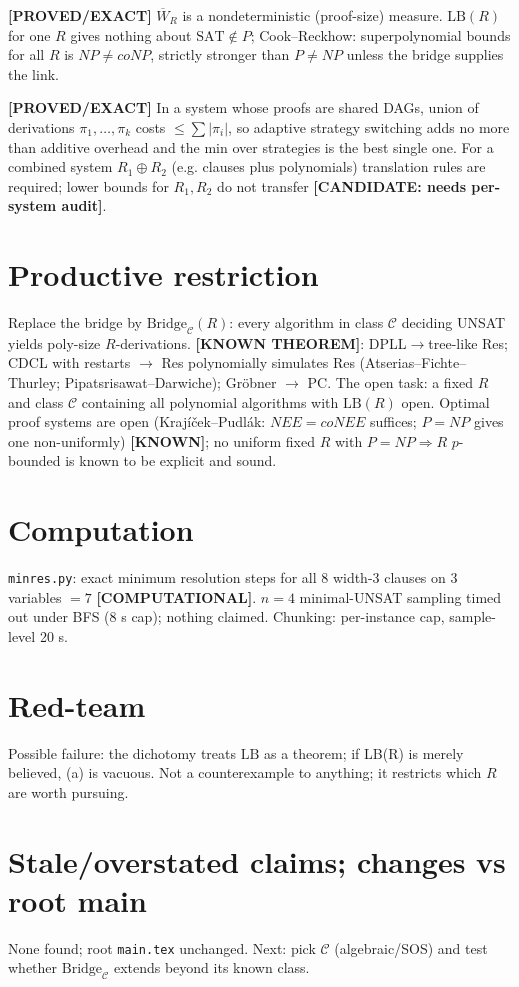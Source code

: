 \documentclass[11pt]{article}
\newcommand{\SAT}{\mathrm{SAT}}\newcommand{\status}[1]{\textbf{[#1]}}
\begin{document}
\begin{proposition}[Nondeterminism]\status{PROVED/EXACT}
$\overline W_R$ is a nondeterministic (proof-size) measure. $\mathrm{LB}(R)$ for one $R$ gives nothing about $\SAT\notin P$; Cook--Reckhow: superpolynomial bounds for all $R$ is $NP\ne coNP$, strictly stronger than $P\neq NP$ unless the bridge supplies the link.
\end{proposition}

\begin{proposition}\status{PROVED/EXACT}
In a system whose proofs are shared DAGs, union of derivations $\pi_1,\dots,\pi_k$ costs $\le\sum|\pi_i|$, so adaptive strategy switching adds no more than additive overhead and the min over strategies is the best single one. For a combined system $R_1\oplus R_2$ (e.g. clauses plus polynomials) translation rules are required; lower bounds for $R_1,R_2$ do not transfer \status{CANDIDATE: needs per-system audit}.
\end{proposition}

\section{Productive restriction}
Replace the bridge by $\mathrm{Bridge}_{\mathcal C}(R)$: every algorithm in class $\mathcal C$ deciding UNSAT yields poly-size $R$-derivations. \status{KNOWN THEOREM}: DPLL$\to$tree-like Res; CDCL with restarts $\to$ Res polynomially simulates Res (Atserias--Fichte--Thurley; Pipatsrisawat--Darwiche); Gr\"obner $\to$ PC. The open task: a fixed $R$ and class $\mathcal C$ containing all polynomial algorithms with $\mathrm{LB}(R)$ open. Optimal proof systems are open (Kraj\'i\v{c}ek--Pudl\'ak: $NEE{=}coNEE$ suffices; $P{=}NP$ gives one non-uniformly) \status{KNOWN}; no uniform fixed $R$ with $P{=}NP\Rightarrow R$ $p$-bounded is known to be explicit and sound.

\section{Computation}
\texttt{minres.py}: exact minimum resolution steps for all 8 width-3 clauses on 3 variables $=7$ \status{COMPUTATIONAL}. $n=4$ minimal-UNSAT sampling timed out under BFS (8 s cap); nothing claimed. Chunking: per-instance cap, sample-level 20 s.

\section{Red-team}
Possible failure: the dichotomy treats $\mathrm{LB}$ as a theorem; if LB(R) is merely believed, (a) is vacuous. Not a counterexample to anything; it restricts which $R$ are worth pursuing.

\section{Stale/overstated claims; changes vs root main}
None found; root \texttt{main.tex} unchanged. Next: pick $\mathcal C$ (algebraic/SOS) and test whether $\mathrm{Bridge}_{\mathcal C}$ extends beyond its known class.

\end{document}

